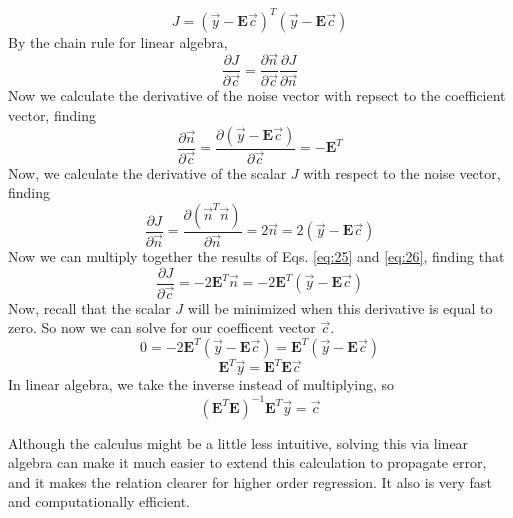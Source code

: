 \documentclass{article}
\begin{document}
\begin{equation}
\label{eq:23}
J = (\vec{y} - \mathbf{E}\vec{c})^T(\vec{y} - \mathbf{E} \vec{c})
\end{equation}
By the chain rule for linear algebra, 
\begin{equation}
\label{eq:24}
\frac{\partial J}{\partial \vec{c}} = \frac{\partial \vec{n}}{\partial \vec{c}} \frac{\partial J}{\partial \vec{n}}
\end{equation}
Now we calculate the derivative of the noise vector with repsect to the coefficient vector, finding
\begin{equation}
\label{eq:25}
\frac{\partial\vec{n}}{\partial \vec{c}} = \frac{\partial (\vec{y} - \mathbf{E} \vec{c})}{\partial \vec{c}} = -\mathbf{E}^{T}
\end{equation}
Now, we calculate the derivative of the scalar $J$ with respect to the noise vector, finding
\begin{equation}
\label{eq:26}
\frac{\partial J}{\partial \vec{n}} = \frac{\partial (\vec{n}^T\vec{n})}{\partial \vec{n}} = 2 \vec{n} = 2(\vec{y}-\mathbf{E}\vec{c})
\end{equation}
Now we can multiply together the results of Eqs. \ref{eq:25} and \ref{eq:26}, finding that
\begin{equation}
\label{eq:27}
\frac{\partial J}{\partial \vec{c}} = -2 \mathbf{E}^T \vec{n} = -2 \mathbf{E}^T (\vec{y} - \mathbf{E}\vec{c})
\end{equation}
Now, recall that the scalar $J$ will be minimized when this derivative is equal to zero. So now we can solve for our coefficent vector $\vec{c}$.
\begin{equation}
\label{eq:28}
0 = -2 \mathbf{E}^T (\vec{y} - \mathbf{E}\vec{c}) = \mathbf{E}^T (\vec{y} - \mathbf{E}\vec{c})
\end{equation}
\begin{equation}
\label{eq:29}
\mathbf{E}^T \vec{y} =  \mathbf{E}^T \mathbf{E}\vec{c}
\end{equation}
In linear algebra, we take the inverse instead of multiplying, so
\begin{equation}
\label{eq:30}
( \mathbf{E}^T \mathbf{E} ) ^{-1} \mathbf{E}^T \vec{y} = \vec{c}
\end{equation}

Although the calculus might be a little less intuitive, solving this via linear algebra can make it much easier to extend this calculation to propagate error, and it makes the relation clearer for higher order regression. It also is very fast and computationally efficient.
\end{document}

